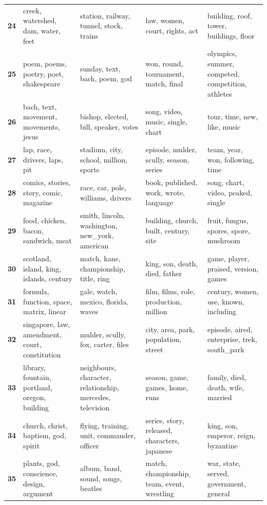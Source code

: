 \begin{xltabular}{\textwidth}{@{}l >{\RaggedRight\arraybackslash}X >{\RaggedRight\arraybackslash}X >{\RaggedRight\arraybackslash}X >{\RaggedRight\arraybackslash}X@{}}
    \textbf{24} & creek, watershed, dam, water, feet & station, railway, tunnel, stock, trains & law, women, court, rights, act & building, roof, tower, buildings, floor \\
    \textbf{25} & poem, poems, poetry, poet, shakespeare & sunday, text, bach, poem, god & won, round, tournament, match, final & olympics, summer, competed, competition, athletes \\
    \textbf{26} & bach, text, movement, movements, jesus & bishop, elected, bill, speaker, votes & song, video, music, single, chart & tour, time, new, like, music \\
    \textbf{27} & lap, race, drivers, laps, pit & stadium, city, school, million, sports & episode, mulder, scully, season, series & team, year, won, following, time \\
    \textbf{28} & comics, stories, story, comic, magazine & race, car, pole, williams, drivers & book, published, work, wrote, language & song, chart, video, peaked, single \\
    \textbf{29} & food, chicken, bacon, sandwich, meat & smith, lincoln, washington, new\_york, american & building, church, built, century, site & fruit, fungus, spores, spore, mushroom \\
    \textbf{30} & scotland, island, king, islands, century & match, kane, championship, title, ring & king, son, death, died, father & game, player, praised, version, games \\
    \textbf{31} & formula, function, space, matrix, linear & gale, watch, mexico, florida, waves & film, films, role, production, million & century, women, use, known, including \\
    \textbf{32} & singapore, law, amendment, court, constitution & mulder, scully, fox, carter, files & city, area, park, population, street & episode, aired, enterprise, trek, south\_park \\
    \textbf{33} & library, fountain, portland, oregon, building & neighbours, character, relationship, mercedes, television & season, game, games, home, runs & family, died, death, wife, married \\
    \textbf{34} & church, christ, baptism, god, spirit & flying, training, unit, commander, officer & series, story, released, characters, japanese & king, son, emperor, reign, byzantine \\
    \textbf{35} & plants, god, conscience, design, argument & album, band, sound, songs, beatles & match, championship, team, event, wrestling & war, state, served, government, general \\

\end{xltabular}
